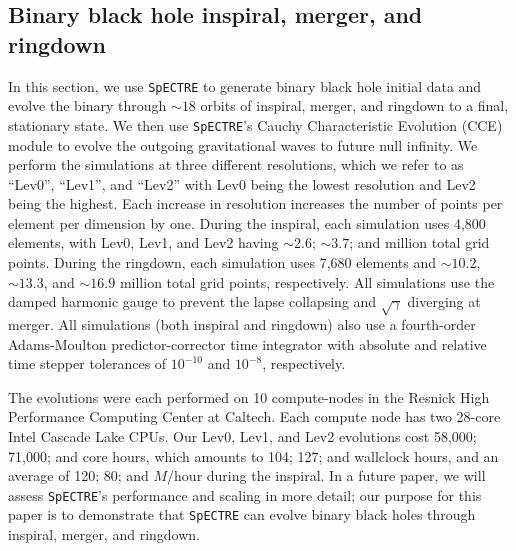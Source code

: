 \documentclass[12pt]{caltech_thesis}
\newcommand{\response}[1]{{\color{black}{#1}}}
\begin{document}
\begin{bibunit}[unsrtnat]
\subsection{Binary black hole inspiral, merger, and ringdown\label{sec:binary
    black hole IMR}\label{sec:bbh results}}

In this section, we use \texttt{SpECTRE} to generate binary black hole initial
data and evolve the binary through $\sim18$ orbits of inspiral, merger, and
ringdown to a final, stationary state.  We then use \texttt{SpECTRE}'s Cauchy
Characteristic Evolution (CCE) module to evolve the outgoing gravitational waves
to future null infinity.  We perform the simulations at three different
resolutions, which we refer to as ``Lev0'', ``Lev1'', and ``Lev2'' with Lev0
being the lowest resolution and Lev2 being the highest. Each increase in
resolution increases the number of points per element per dimension by one.
During the inspiral, each simulation uses 4,800 elements, with Lev0, Lev1, and
Lev2 having $\sim2.6$; $\sim3.7$; and \response{$\sim5.0$} million total grid
points. During the ringdown, each simulation uses 7,680 elements and $\sim10.2$,
$\sim13.3$, and $\sim16.9$ million total grid points, respectively. All
simulations use the damped harmonic gauge to prevent the lapse collapsing and
$\sqrt{\gamma}$ diverging at merger. All simulations (both inspiral and
ringdown) also use a fourth-order Adams-Moulton predictor-corrector time
integrator with absolute and relative time stepper tolerances of $10^{-10}$ and
$10^{-8}$, respectively.

The evolutions were each performed on 10 compute-nodes in the Resnick High
Performance Computing Center at Caltech. Each compute node has two 28-core Intel
Cascade Lake CPUs. Our Lev0, Lev1, and Lev2 evolutions cost 58,000; 71,000; and
\response{117,000} core hours, which amounts to 104; 127; and \response{209}
wallclock hours, and an average of 120; 80; and \response{41} $M$/hour during
the inspiral.  In a future paper, we will assess \texttt{SpECTRE}'s performance
and scaling in more detail; our purpose for this paper is to demonstrate that
\texttt{SpECTRE} can evolve binary black holes through inspiral, merger, and
ringdown.


\end{bibunit}
\end{document}
